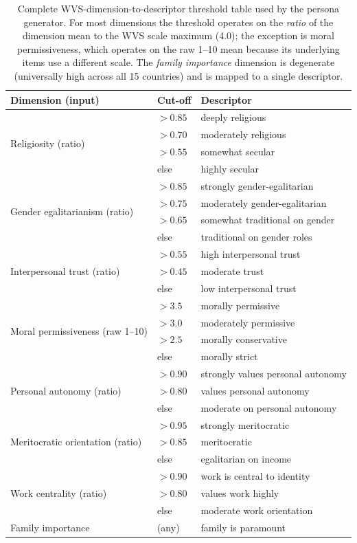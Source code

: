 \documentclass{article}
\begin{document}
\begin{table}[h]\centering\small
\caption{Complete WVS-dimension-to-descriptor threshold table used by the
persona generator. For most dimensions the threshold operates on the
\emph{ratio} of the dimension mean to the WVS scale maximum (4.0); the
exception is moral permissiveness, which operates on the raw 1--10 mean
because its underlying items use a different scale. The \emph{family
importance} dimension is degenerate (universally high across all 15
countries) and is mapped to a single descriptor.}
\label{tab:wvs_thresholds}
\setlength{\tabcolsep}{4pt}
\begin{tabular}{lll}\toprule
Dimension (input) & Cut-off & Descriptor \\\midrule
\multirow{4}{*}{Religiosity (ratio)}
 & $>0.85$ & deeply religious \\
 & $>0.70$ & moderately religious \\
 & $>0.55$ & somewhat secular \\
 & else & highly secular \\\midrule
\multirow{4}{*}{Gender egalitarianism (ratio)}
 & $>0.85$ & strongly gender-egalitarian \\
 & $>0.75$ & moderately gender-egalitarian \\
 & $>0.65$ & somewhat traditional on gender \\
 & else & traditional on gender roles \\\midrule
\multirow{3}{*}{Interpersonal trust (ratio)}
 & $>0.55$ & high interpersonal trust \\
 & $>0.45$ & moderate trust \\
 & else & low interpersonal trust \\\midrule
\multirow{4}{*}{Moral permissiveness (raw 1--10)}
 & $>3.5$ & morally permissive \\
 & $>3.0$ & moderately permissive \\
 & $>2.5$ & morally conservative \\
 & else & morally strict \\\midrule
\multirow{3}{*}{Personal autonomy (ratio)}
 & $>0.90$ & strongly values personal autonomy \\
 & $>0.80$ & values personal autonomy \\
 & else & moderate on personal autonomy \\\midrule
\multirow{3}{*}{Meritocratic orientation (ratio)}
 & $>0.95$ & strongly meritocratic \\
 & $>0.85$ & meritocratic \\
 & else & egalitarian on income \\\midrule
\multirow{3}{*}{Work centrality (ratio)}
 & $>0.90$ & work is central to identity \\
 & $>0.80$ & values work highly \\
 & else & moderate work orientation \\\midrule
Family importance & (any) & family is paramount \\\bottomrule
\end{tabular}
\end{table}
\end{document}

